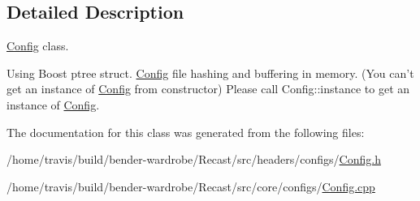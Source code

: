 \subsection{Detailed Description}
\hyperlink{class_config}{Config} class. 

Using Boost ptree struct. \hyperlink{class_config}{Config} file hashing and buffering in memory. (You can't get an instance of \hyperlink{class_config}{Config} from constructor) Please call Config\-::instance to get an instance of \hyperlink{class_config}{Config}. 

The documentation for this class was generated from the following files\-:\begin{DoxyCompactItemize}
\item 
/home/travis/build/bender-\/wardrobe/\-Recast/src/headers/configs/\hyperlink{_config_8h}{Config.\-h}\item 
/home/travis/build/bender-\/wardrobe/\-Recast/src/core/configs/\hyperlink{_config_8cpp}{Config.\-cpp}\end{DoxyCompactItemize}
